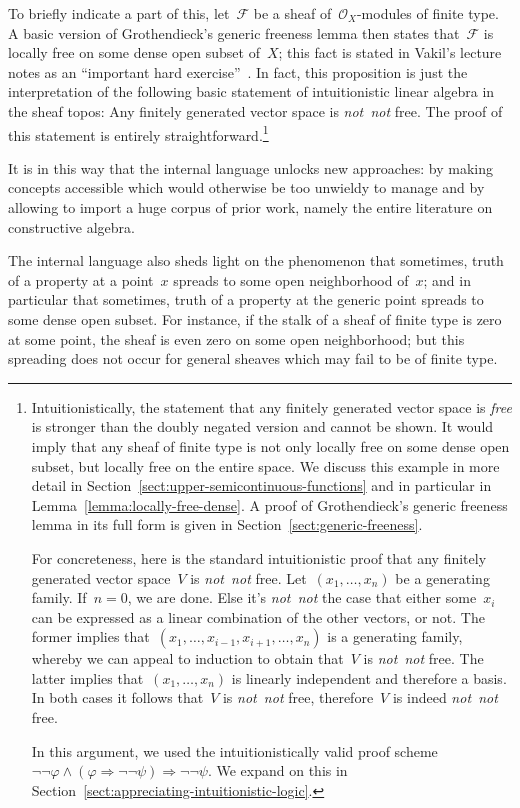\documentclass[10pt,reqno,a4paper]{amsbook}
\theoremstyle{definition}
\theoremstyle{plain}
\theoremstyle{remark}
\newcommand{\F}{\mathcal{F}}
\renewcommand{\O}{\mathcal{O}}
\newcommand{\?}{\,{:}\,}
\renewcommand{\_}{\mathpunct{.}\,}
\newcommand{\notnot}{\emph{not~not}\xspace}
\begin{document}
{To briefly indicate a part of this, let~$\F$ be a sheaf of~$\O_X$-modules of finite
type. A basic version of Grothendieck's generic freeness lemma then states
that~$\F$ is locally free on some dense open subset of~$X$; this fact
is stated in Vakil's lecture notes as an ``important hard
exercise''~\cite[Exercise~13.7.K]{vakil:foag}. In fact, this proposition is just the
interpretation of the following basic statement of intuitionistic linear algebra in
the sheaf topos: Any finitely generated vector space is \notnot free.
The proof of this statement is entirely straightforward.\footnote{Intuitionistically,
the statement that any finitely generated vector space is \emph{free} is stronger than
the doubly negated version and cannot be shown. It would imply that any sheaf
of finite type is not only locally free on some dense open subset, but locally
free on the entire space. We discuss this example in more detail in
Section~\ref{sect:upper-semicontinuous-functions} and in particular in
Lemma~\ref{lemma:locally-free-dense}. A proof of Grothendieck's generic
freeness lemma in its full form is given in
Section~\ref{sect:generic-freeness}.

For concreteness, here is the standard intuitionistic proof that any finitely
generated vector space~$V$ is \notnot free. Let~$(x_1,\ldots,x_n)$ be a
generating family. If~$n = 0$, we are done. Else it's \notnot the case that
either some~$x_i$ can be expressed as a linear combination of the other
vectors, or not. The former implies
that~$(x_1,\ldots,x_{i-1},x_{i+1},\ldots,x_n)$ is a generating family, whereby
we can appeal to induction to obtain that~$V$ is \notnot free. The latter implies that~$(x_1,\ldots,x_n)$ is
linearly independent and therefore a basis. In both cases it follows that~$V$
is \notnot free, therefore~$V$ is indeed \notnot free.

In this argument, we used the intuitionistically valid proof
scheme~$\neg\neg\varphi \wedge (\varphi \Rightarrow \neg\neg\psi) \Longrightarrow
\neg\neg\psi$. We expand on this in
Section~\ref{sect:appreciating-intuitionistic-logic}.}

It is in this way that the internal language unlocks new approaches: by
making concepts accessible which would otherwise be too unwieldy to manage and
by allowing to import a huge corpus of prior work, namely the entire literature
on constructive algebra.

The internal language also sheds light on the phenomenon that
sometimes, truth of a property at a point~$x$ spreads to some open
neighborhood of~$x$; and in particular that sometimes, truth of a property at
the generic point spreads to some dense open subset. For instance, if the stalk
of a sheaf of finite type is zero at some point, the sheaf is even zero on some
open neighborhood; but this spreading does not occur for general sheaves which
may fail to be of finite type.

}
\end{document}
